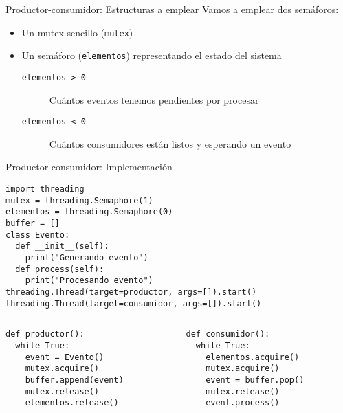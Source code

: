\documentclass[presentation]{beamer}
\begin{document}
\begin{frame}[label={sec:orgee2fe8a},fragile]{Productor-consumidor: Estructuras a emplear}
 Vamos a emplear dos semáforos:
\begin{itemize}
\item Un mutex sencillo (\texttt{mutex})
\item Un semáforo (\texttt{elementos}) representando el estado del sistema
\begin{description}
\item[{\texttt{elementos > 0}}] Cuántos eventos tenemos pendientes por
procesar
\item[{\texttt{elementos < 0}}] Cuántos consumidores están listos y
esperando un evento
\end{description}
\end{itemize}
\end{frame}

\begin{frame}[label={sec:org76381ce},fragile]{Productor-consumidor: Implementación}
 \begin{verbatim}
import threading
mutex = threading.Semaphore(1)
elementos = threading.Semaphore(0)
buffer = []
class Evento:
  def __init__(self):
    print("Generando evento")
  def process(self):
    print("Procesando evento")
threading.Thread(target=productor, args=[]).start()
threading.Thread(target=consumidor, args=[]).start()
\end{verbatim}
\begin{columns}\begin{column}{0.5\textwidth}
\begin{verbatim}
def productor():
  while True:
    event = Evento()
    mutex.acquire()
    buffer.append(event)
    mutex.release()
    elementos.release()
\end{verbatim}
\end{column} \begin{column}{0.5\textwidth}
\begin{verbatim}
def consumidor():
  while True:
    elementos.acquire()
    mutex.acquire()
    event = buffer.pop()
    mutex.release()
    event.process()
\end{verbatim}
\end{column}\end{columns}
\end{frame}
\end{document}
